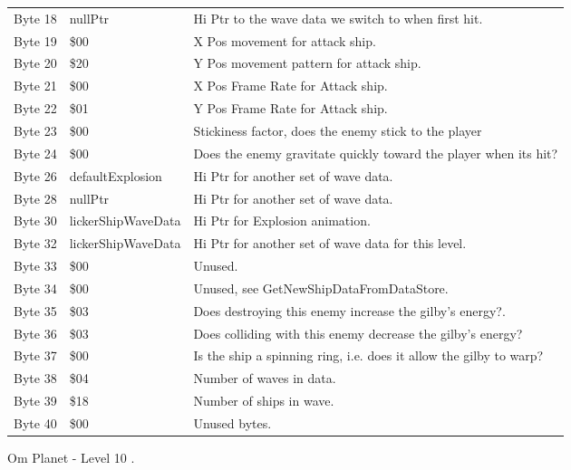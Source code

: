 \begin{figure}[H]
{\begin{adjustbox}{width=12cm}
\begin{tabular}{lll}
 Byte 18 & nullPtr            & Hi Ptr to the wave data we switch to when first hit.               \\
 Byte 19 & \$00                & X Pos movement for attack ship.                                    \\
 Byte 20 & \$20                & Y Pos movement pattern for attack ship.                            \\
 Byte 21 & \$00                & X Pos Frame Rate for Attack ship.                                  \\
 Byte 22 & \$01                & Y Pos Frame Rate for Attack ship.                                  \\
 Byte 23 & \$00                & Stickiness factor, does the enemy stick to the player              \\
 Byte 24 & \$00                & Does the enemy gravitate quickly toward the player when its hit?   \\
 Byte 26 & defaultExplosion   & Hi Ptr for another set of wave data.                               \\
 Byte 28 & nullPtr            & Hi Ptr for another set of wave data.                               \\
 Byte 30 & lickerShipWaveData & Hi Ptr for Explosion animation.                                    \\
 Byte 32 & lickerShipWaveData & Hi Ptr for another set of wave data for this level.                \\
 Byte 33 & \$00                & Unused.                                                            \\
 Byte 34 & \$00                & Unused, see GetNewShipDataFromDataStore.                           \\
 Byte 35 & \$03                & Does destroying this enemy increase the gilby's energy?.           \\
 Byte 36 & \$03                & Does colliding with this enemy decrease the gilby's energy?        \\
 Byte 37 & \$00                & Is the ship a spinning ring, i.e. does it allow the gilby to warp? \\
 Byte 38 & \$04                & Number of waves in data.                                           \\
 Byte 39 & \$18                & Number of ships in wave.                                           \\
 Byte 40 & \$00                & Unused bytes.                                                      \\
\bottomrule
\end{tabular}

  \end{adjustbox}

  }\caption*{Om Planet - Level 10
.}
\end{figure}

